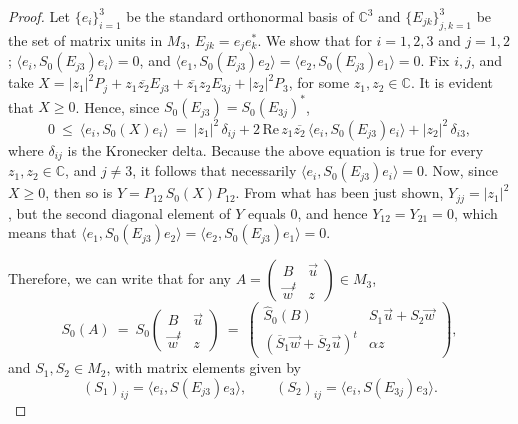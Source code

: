 \documentclass[12pt]{article}
\theoremstyle{plain}
\theoremstyle{definition}
\theoremstyle{remark}
\numberwithin{equation}{section}
\begin{document}
\begin{proof}
Let $\{e_{i}\}_{i=1}^{3}$ be the standard orthonormal basis of $\mathbb{C}^{3}$
and $\{ E_{jk} \}_{j,k=1}^{3}$ be the set of matrix units in $M_{3}$,
$E_{jk} = e_{j} e_{k}^{*}$.
We show that for $i = 1,2,3$ and $j=1,2$;
$\langle e_{i}, S_{0}(E_{j3}) e_{i} \rangle = 0$,
and $\langle e_{1}, S_{0}(E_{j3}) e_{2} \rangle = 
    \langle e_{2}, S_{0}(E_{j3}) e_{1} \rangle = 0$.
Fix $i,j$, and take 
$X = |z_{1}|^{2} P_{j} + z_{1} \overline{z_{2}} E_{j3} +
\overline{z_{1}} z_{2} E_{3j} + |z_{2}|^{2} P_{3}$,
for some $z_{1}, z_{2} \in \mathbb{C}$.
It is evident that $X \geq 0$. 
Hence, since $S_{0}(E_{j3}) = S_{0}(E_{3j})^{*}$,
\begin{equation}
0 \: \leq \: \langle e_{i}, S_{0}(X) e_{i} \rangle \: = \:
|z_{1}|^{2} \, \delta_{ij} +
2 \, \text{Re} \, z_{1} \overline{z_{2}} \,
    \langle e_{i}, S_{0}(E_{j3}) e_{i} \rangle +
|z_{2}|^{2} \, \delta_{i3},
\end{equation}
where $\delta_{ij}$ is the Kronecker delta.
Because the above equation is true for every $z_{1}, z_{2} \in \mathbb{C}$,
and $j \neq 3$,
it follows that necessarily 
$\langle e_{i}, S_{0}(E_{j3}) e_{i} \rangle =0$. 
Now, since $X \geq 0$, then so is $Y = P_{12} \, S_{0}(X) P_{12}$.
From what has been just shown, 
$Y_{jj} = |z_{1}|^{2}$,
but the second diagonal element of $Y$ equals 0, and
hence $Y_{12} = Y_{21} = 0$,
which means that
$\langle e_{1}, S_{0}(E_{j3}) e_{2} \rangle
    = \langle e_{2}, S_{0}(E_{j3}) e_{1} \rangle = 0$.

Therefore, we can write that for any
$A  =   \left( \begin{smallmatrix}
    B & \vec{u} \\
    \vec{w}^{t} & z
    \end{smallmatrix} \right) \in M_{3}$,
\begin{equation}
    S_{0}(A) \:=\: S_{0} \begin{pmatrix}
    B & \vec{u} \\
    \vec{w}^{t} & z
    \end{pmatrix} \: = \:
    \begin{pmatrix}
        \hat{S}_{0}(B) & S_{1} \vec{u} + S_{2} \vec{w} \\
        (\overline{S}_{1} \vec{w} + \overline{S}_{2} \vec{u})^{t} & \alpha z
    \end{pmatrix},
\end{equation}
and $S_{1}, S_{2} \in M_{2}$, with matrix elements given by
\begin{equation}
(S_{1})_{ij} = \langle e_{i}, S(E_{j3}) e_{3} \rangle, \quad \quad
(S_{2})_{ij} = \langle e_{i}, S(E_{3j}) e_{3} \rangle.
\end{equation}


\end{proof}
\end{document}
